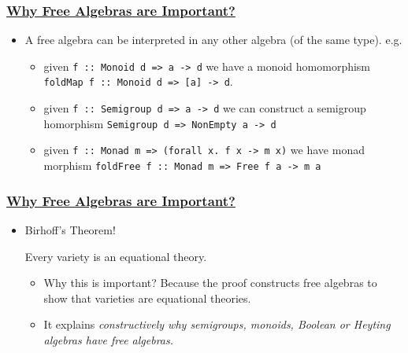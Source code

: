 \documentclass[t,dvipsnames]{beamer}
\begin{document}
\begin{frame}[c]
  \frametitle{\underline{Why Free Algebras are Important?}}
  \begin{itemize}
    \item A free algebra can be interpreted in any other algebra (of the same
    type). e.g.\\[10pt]
        \begin{itemize}
          \item given \texttt{f :: Monoid d => a -> d} we have
            a monoid homomorphism
                \texttt{foldMap f :: Monoid d => [a] ->
                d}.\\[10pt]
          \item given \texttt{f :: Semigroup d => a -> d}
            we can construct a semigroup homorphism
            \texttt{Semigroup d => NonEmpty a -> d}\\[10pt]
          \item given \texttt{f :: Monad m => (forall x. f x ->
            m x)} we have monad morphism
            \texttt{foldFree f :: Monad m => Free f a -> m a}
        \end{itemize}
  \end{itemize}
\end{frame}
\begin{frame}
  \frametitle{\underline{Why Free Algebras are Important?}}
  \begin{itemize}
    \item Birhoff's Theorem!
      \begin{theorem}[G.Birkhoff 1935]
        Every variety is an equational theory.
      \end{theorem}
      \begin{itemize}
        \item Why this is important?  Because the proof constructs free
          algebras to show that varieties are equational theories.\\[10pt]
        \item It explains \it{constructively} why semigroups, monoids, Boolean
          or Heyting algebras have free algebras.
      \end{itemize}
  \end{itemize}
\end{frame}
\end{document}
